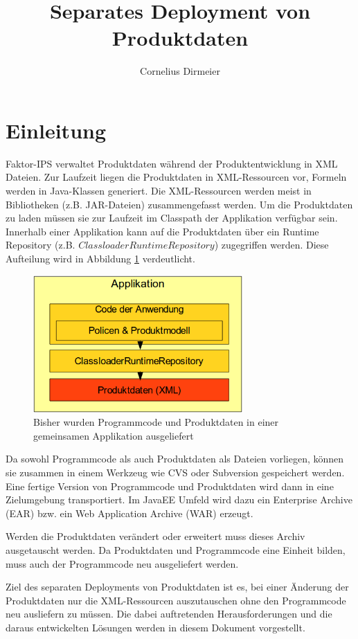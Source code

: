 \documentclass[headsepline=true, footsepline=true]{scrartcl}
\title{Separates Deployment von Produktdaten}
\author{Cornelius Dirmeier}
\begin{document}
\maketitle

\section{Einleitung}

Faktor-IPS verwaltet Produktdaten während der Produktentwicklung in XML Dateien.
Zur Laufzeit liegen die Produktdaten in XML-Ressourcen vor, Formeln werden in
Java-Klassen generiert. Die XML-Ressourcen werden meist in Bibliotheken (z.B.
JAR-Dateien) zusammengefasst werden. Um die Produktdaten zu laden müssen sie zur Laufzeit im Classpath der
Applikation verfügbar sein. Innerhalb einer Applikation kann auf die Produktdaten über ein
Runtime Repository (z.B. $ClassloaderRuntimeRepository$) zugegriffen werden.
Diese Aufteilung wird in Abbildung \ref{old_architecture} verdeutlicht. 

\begin{figure}[htb] \centering
\includegraphics[width=8cm]{./pics/old_architecture.png} \caption{Bisher wurden
Programmcode und Produktdaten in einer gemeinsamen Applikation ausgeliefert}
\label{old_architecture}
\end{figure}

Da sowohl Programmcode als auch Produktdaten als Dateien vorliegen, können sie
zusammen in einem Werkzeug wie CVS oder Subversion gespeichert werden. Eine
fertige Version von Programmcode und Produktdaten wird dann in eine Zielumgebung
transportiert. Im JavaEE Umfeld wird dazu ein Enterprise Archive (EAR) bzw. ein
Web Application Archive (WAR) erzeugt.

Werden die Produktdaten verändert oder erweitert muss dieses Archiv ausgetauscht
werden. Da Produktdaten und Programmcode eine Einheit bilden, muss auch der
Programmcode neu ausgeliefert werden.

Ziel des separaten Deployments von Produktdaten ist es, bei einer Änderung der
Produktdaten nur die XML-Ressourcen auszutauschen ohne den Programmcode neu
ausliefern zu müssen. Die dabei auftretenden Herausforderungen und die daraus
entwickelten Lösungen werden in diesem Dokument vorgestellt.
\end{document}
